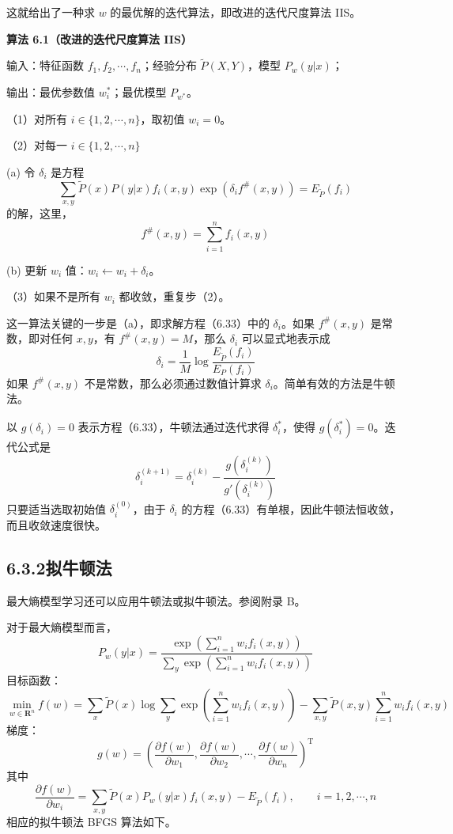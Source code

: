 \documentclass[UTF8, 12pt, fontset=fandol, oneside]{ctexart}
\begin{document}
这就给出了一种求 $w$ 的最优解的迭代算法，即改进的迭代尺度算法 IIS。

\noindent\textbf{算法 6.1（改进的迭代尺度算法 IIS）}\quad

输入：特征函数 $f_1,f_2,\cdots,f_n$；经验分布 $\tilde{P}(X,Y)$，模型 $P_w(y|x)$；

输出：最优参数值 $w_i^*$；最优模型 $P_{w^*}$。

（1）对所有 $i\in\{1,2,\cdots,n\}$，取初值 $w_i=0$。

（2）对每一 $i\in\{1,2,\cdots,n\}$

\quad (a) 令 $\delta_i$ 是方程
\[
\sum_{x,y}\tilde{P}(x)P(y|x)f_i(x,y)\exp(\delta_i f^\#(x,y))=E_{\tilde{P}}(f_i)
\]
的解，这里，
\[
f^\#(x,y)=\sum_{i=1}^n f_i(x,y)
\]

\quad (b) 更新 $w_i$ 值：$w_i\leftarrow w_i+\delta_i$。

（3）如果不是所有 $w_i$ 都收敛，重复步（2）。

这一算法关键的一步是（a），即求解方程（6.33）中的 $\delta_i$。如果 $f^\#(x,y)$ 是常数，即对任何 $x,y$，有 $f^\#(x,y)=M$，那么 $\delta_i$ 可以显式地表示成
\begin{equation}
\delta_i=\frac{1}{M}\log\frac{E_{\tilde{P}}(f_i)}{E_P(f_i)}
\tag{6.34}
\end{equation}
如果 $f^\#(x,y)$ 不是常数，那么必须通过数值计算求 $\delta_i$。简单有效的方法是牛顿法。

以 $g(\delta_i)=0$ 表示方程（6.33），牛顿法通过迭代求得 $\delta_i^*$，使得 $g(\delta_i^*)=0$。迭代公式是
\begin{equation}
\delta_i^{(k+1)}=\delta_i^{(k)}-\frac{g(\delta_i^{(k)})}{g'(\delta_i^{(k)})}
\tag{6.35}
\end{equation}
只要适当选取初始值 $\delta_i^{(0)}$，由于 $\delta_i$ 的方程（6.33）有单根，因此牛顿法恒收敛，而且收敛速度很快。

\subsection*{6.3.2\quad 拟牛顿法}

最大熵模型学习还可以应用牛顿法或拟牛顿法。参阅附录 B。

对于最大熵模型而言，
\[
P_w(y|x)=\frac{\exp\left(\sum_{i=1}^n w_i f_i(x,y)\right)}
{\sum_y\exp\left(\sum_{i=1}^n w_i f_i(x,y)\right)}
\]
目标函数：
\[
\min_{w\in\mathbf{R}^n} f(w)
=\sum_x\tilde{P}(x)\log\sum_y\exp\left(\sum_{i=1}^n w_i f_i(x,y)\right)
-\sum_{x,y}\tilde{P}(x,y)\sum_{i=1}^n w_i f_i(x,y)
\]
梯度：
\[
g(w)=\left(\frac{\partial f(w)}{\partial w_1},\frac{\partial f(w)}{\partial w_2},\cdots,\frac{\partial f(w)}{\partial w_n}\right)^{\mathrm{T}}
\]
其中
\[
\frac{\partial f(w)}{\partial w_i}
=\sum_{x,y}\tilde{P}(x)P_w(y|x)f_i(x,y)-E_{\tilde{P}}(f_i),
\qquad i=1,2,\cdots,n
\]
相应的拟牛顿法 BFGS 算法如下。
\end{document}
